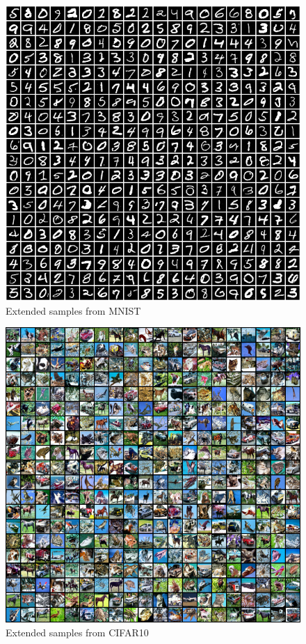 \begin{figure}[h!]
    \centering
    \includegraphics[width=\linewidth]{figures/samples/mnist_samples_large.png}
    \caption{Extended samples from MNIST}
    \label{fig:mnist-samples-large}
\end{figure}

\begin{figure}[h!]
    \centering
    \includegraphics[width=\linewidth]{figures/samples/refinenet128_cifar10_L10_step120000_20x20.png}
    \caption{Extended samples from CIFAR10}
    \label{fig:cifar10-samples-large}
\end{figure}

